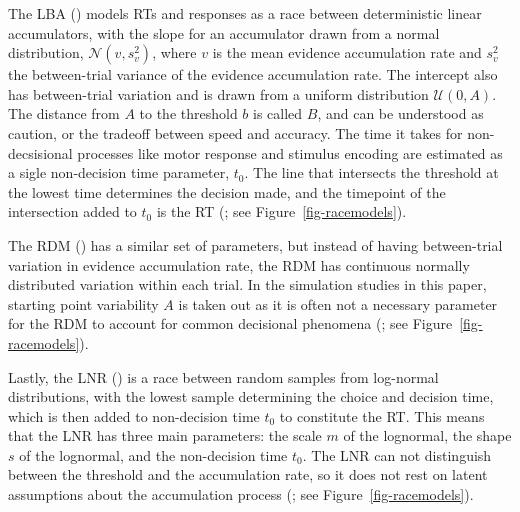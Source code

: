 \documentclass[
  stu,
  floatsintext,
  longtable,
  nolmodern,
  notxfonts,
  notimes,
  draftfirst,
  colorlinks=true,linkcolor=blue,citecolor=blue,urlcolor=blue]{apa7}
\begin{document}
The LBA () models RTs and
responses as a race between deterministic linear accumulators, with the
slope for an accumulator drawn from a normal distribution,
\(\mathcal{N}(v, s_{v}^2)\), where \(v\) is the mean evidence
accumulation rate and \(s_v^2\) the between-trial variance of the
evidence accumulation rate. The intercept also has between-trial
variation and is drawn from a uniform distribution \(\mathcal{U}(0,A)\).
The distance from \(A\) to the threshold \(b\) is called \(B\), and can
be understood as caution, or the tradeoff between speed and accuracy.
The time it takes for non-decsisional processes like motor response and
stimulus encoding are estimated as a sigle non-decision time parameter,
\(t_0\). The line that intersects the threshold at the lowest time
determines the decision made, and the timepoint of the intersection
added to \(t_0\) is the RT (; see Figure~\ref{fig-racemodels}).

The RDM () has a similar set of
parameters, but instead of having between-trial variation in evidence
accumulation rate, the RDM has continuous normally distributed variation
within each trial. In the simulation studies in this paper, starting
point variability \(A\) is taken out as it is often not a necessary
parameter for the RDM to account for common decisional phenomena
(; see
Figure~\ref{fig-racemodels}).

Lastly, the LNR () is a race
between random samples from log-normal distributions, with the lowest
sample determining the choice and decision time, which is then added to
non-decision time \(t_0\) to constitute the RT. This means that the LNR
has three main parameters: the scale \(m\) of the lognormal, the shape
\(s\) of the lognormal, and the non-decision time \(t_0\). The LNR can
not distinguish between the threshold and the accumulation rate, so it
does not rest on latent assumptions about the accumulation process
(; see
Figure~\ref{fig-racemodels}).
\end{document}
